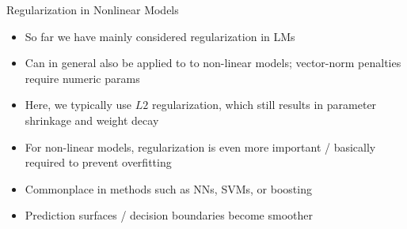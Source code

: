 \documentclass[11pt,compress,t,notes=noshow, xcolor=table]{beamer}
\begin{document}
\begin{vbframe}{Regularization in Nonlinear Models}

\begin{itemize}
  \item So far we have mainly considered regularization in LMs
  \item Can in general also be applied to to non-linear models; vector-norm penalties require numeric params 
  \item Here, we typically use $L2$ regularization, which
    still results in parameter shrinkage and weight decay
  \item For non-linear models, regularization is even more important / basically required to prevent overfitting
  \item Commonplace in methods such as NNs, SVMs, or boosting
  \item Prediction surfaces / decision boundaries become smoother
\end{itemize}

\end{vbframe}
\end{document}
